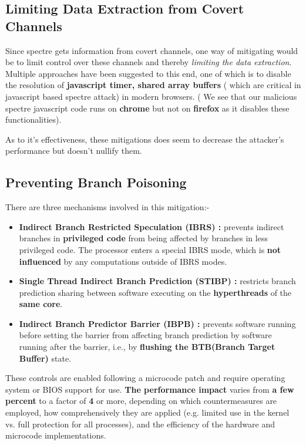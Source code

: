\documentclass[12pt]{article}
\begin{document}
\subsection{Limiting Data Extraction from Covert Channels}
Since spectre gets information from covert channels, one way of mitigating would be to limit control over these channels and thereby \textit{limiting the data extraction}. Multiple approaches have been suggested to this end, one of which is to disable the resolution of \textbf{javascript timer, shared array buffers} ( which are critical in javascript based spectre attack) in modern browsers. ( We see that our malicious spectre javascript code runs on \textbf{chrome} but not on \textbf{firefox} as it disables these functionalities).

As to it's effectiveness, these mitigations does seem to decrease the attacker's performance but doesn't nullify them.
\subsection{Preventing Branch Poisoning}
There are three mechanisms involved in this mitigation:- 
\begin{itemize}
	\item \textbf{Indirect Branch Restricted Speculation (IBRS) : } prevents indirect branches in \textbf{privileged code} from being affected by branches in less privileged code. The processor enters a special IBRS mode, which is \textbf{not influenced} by any computations outside of IBRS modes.
	\item \textbf{Single Thread Indirect Branch Prediction (STIBP) : } restricts branch prediction sharing between software executing on the \textbf{hyperthreads} of the \textbf{same core}.
	\item \textbf{Indirect Branch Predictor Barrier (IBPB) : } prevents software running before setting the barrier from affecting branch prediction by software running after the barrier, i.e., by \textbf{flushing the BTB(Branch Target Buffer)} state.
\end{itemize}
These controls are enabled following a microcode patch and require operating system or BIOS support for use. \textbf{The performance impact} varies from \textbf{a few percent} to a factor of \textbf{4} or more, depending on which countermeasures are employed, how comprehensively they are applied (e.g. limited use in the kernel vs. full protection for all processes), and the efficiency of the hardware and microcode implementations.
\end{document}
